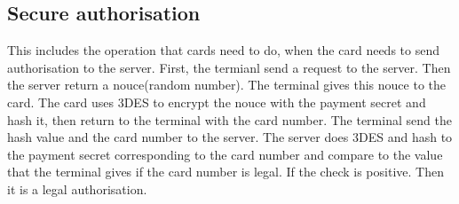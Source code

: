 \documentclass{article}
\begin{document}
        \subsection*{Secure authorisation}
This includes the operation that cards need to do,
when the card needs to send authorisation to the server. 
        \newline
First, the termianl send a request to the server. 
Then the server return a nouce(random number). 
The terminal gives this nouce to the card. 
The card uses 3DES to encrypt the nouce with the payment secret and hash it, then return to the terminal with the card number. 
The terminal send the hash value and the card number to the server. 
The server does 3DES and hash to the payment secret corresponding to the card number and compare to the value that the terminal gives if the card number is legal. 
If the check is positive. 
Then it is a legal authorisation.
    
\end{document}
